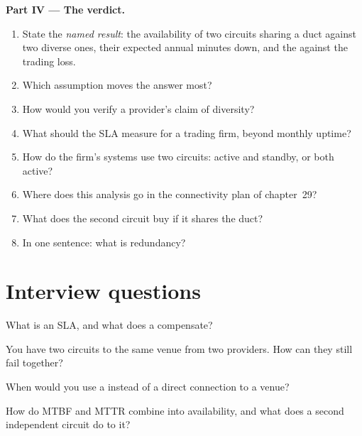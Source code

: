 \begin{problem}
\medskip\noindent\textbf{Part IV --- The verdict.}
\begin{enumerate}[resume]
\item State the \emph{named result}: the availability of two circuits sharing a duct against two diverse ones, their expected annual minutes down,
  and the  against the trading loss.
\item Which assumption moves the answer most?
\item How would you verify a provider's claim of diversity?
\item What should the SLA measure for a trading firm, beyond monthly uptime?
\item How do the firm's systems use two circuits: active and standby, or both active?
\item Where does this analysis go in the connectivity plan of chapter~29?
\item What does the second circuit buy if it shares the duct?
\item In one sentence: what is redundancy?
\end{enumerate}
\end{problem}

\section{Interview questions}

\begin{interviewq}\label{iq:nw:buying-connectivity:1}
What is an SLA, and what does a  compensate?
\end{interviewq}

\begin{interviewq}\label{iq:nw:buying-connectivity:2}
You have two circuits to the same venue from two providers. How can they still fail together?
\end{interviewq}

\begin{interviewq}\label{iq:nw:buying-connectivity:3}
When would you use a  instead of a direct connection to a venue?
\end{interviewq}

\begin{interviewq}\label{iq:nw:buying-connectivity:4}
How do MTBF and MTTR combine into availability, and what does a second independent circuit do to it?
\end{interviewq}

